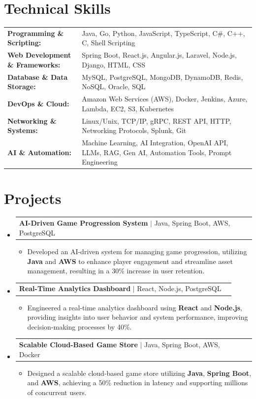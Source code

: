 \documentclass[letterpaper,10pt]{article}
\makeatletter
\newcommand{\resumeItem}[1]{
  \item{\fontsize{8pt}{9pt}\selectfont
    #1 \vspace{-3pt}
  }
}
\newcommand{\resumeProjectHeading}[2]{
    \item
    \begin{tabular*}{1.001\textwidth}{l@{\extracolsep{\fill}}r}
      \fontsize{8.5pt}{10pt}#1 & \textbf{\fontsize{8.5pt}{10pt} #2}\\
    \end{tabular*}\vspace{-7pt}
}
\newcommand{\resumeSubHeadingListStart}{\begin{itemize}[leftmargin=0pt, label={}]}
\newcommand{\resumeSubHeadingListEnd}{\end{itemize}}
\newcommand{\resumeItemListStart}{\begin{itemize}[leftmargin=*]}
\newcommand{\resumeItemListEnd}{\end{itemize}\vspace{-5pt}}
\makeatother
\begin{document}
\section{Technical Skills}
        \vspace{-14pt}
        \begin{table}[h]
            \fontsize{8pt}{9pt}\selectfont
            \begin{tabular}{p{0.3\linewidth} p{0.7\linewidth}}
                \textbf{Programming \& Scripting:} & Java, Go, Python, JavaScript, TypeScript, C\#, C++, C, Shell Scripting \\
                \textbf{Web Development \& Frameworks:} & Spring Boot, React.js, Angular.js, Laravel, Node.js, Django, HTML, CSS \\
                \textbf{Database \& Data Storage:} & MySQL, PostgreSQL, MongoDB, DynamoDB, Redis, NoSQL, Oracle, SQL \\
                \textbf{DevOps \& Cloud:} & Amazon Web Services (AWS), Docker, Jenkins, Azure, Lambda, EC2, S3, Kubernetes \\
                \textbf{Networking \& Systems:} & Linux/Unix, TCP/IP, gRPC, REST API, HTTP, Networking Protocols, Splunk, Git \\
                \textbf{AI \& Automation:} & Machine Learning, AI Integration, OpenAI API, LLMs, RAG, Gen AI, Automation Tools, Prompt Engineering \\
            \end{tabular}
        \end{table}
 \vspace{-18pt}

\section{Projects}
    \vspace{-5pt}
    \resumeSubHeadingListStart
          \resumeProjectHeading
            {\textbf{AI-Driven Game Progression System} $|$ Java, Spring Boot, AWS, PostgreSQL}{}
            \resumeItemListStart
                \resumeItem{Developed an AI-driven system for managing game progression, utilizing \textbf{Java} and \textbf{AWS} to enhance player engagement and streamline asset management, resulting in a 30\% increase in user retention.}
            \resumeItemListEnd
        \vspace{-12pt}
    
        \resumeProjectHeading
            {\textbf{Real-Time Analytics Dashboard} $|$ React, Node.js, PostgreSQL}{}
        \resumeItemListStart
                \resumeItem{Engineered a real-time analytics dashboard using \textbf{React} and \textbf{Node.js}, providing insights into user behavior and system performance, improving decision-making processes by 40\%.}
        \resumeItemListEnd
      \vspace{-12pt}
      \resumeProjectHeading
        {\textbf{Scalable Cloud-Based Game Store} $|$ Java, Spring Boot, AWS, Docker}{}
    \resumeItemListStart
            \resumeItem{Designed a scalable cloud-based game store utilizing \textbf{Java}, \textbf{Spring Boot}, and \textbf{AWS}, achieving a 50\% reduction in latency and supporting millions of concurrent users.}
    \resumeItemListEnd
    \resumeSubHeadingListEnd
\end{document}
